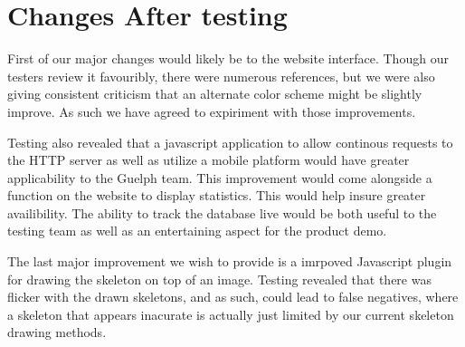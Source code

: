 \documentclass{scrreprt}
\begin{document}
\chapter{Changes After testing}
\begin{flushleft}
First of our major changes would likely be to the website interface. Though our testers review it favouribly, there were numerous references, but we were also giving consistent criticism that an alternate color scheme might be slightly improve. As such we have agreed to expiriment with those improvements. \newline

Testing also revealed that a javascript application to allow continous requests to the HTTP server as well as utilize a mobile platform would have greater applicability to the Guelph team. This improvement would come alongside a function on the website to display statistics. This would help insure greater availibility. The ability to track the database live would be both useful to the testing team as well as an entertaining aspect for the product demo. \newline

The last major improvement we wish to provide is a imrpoved Javascript plugin for drawing the skeleton on top of an image. Testing revealed that there was flicker with the drawn skeletons, and as such, could lead to false negatives, where a skeleton that appears inacurate is actually just limited by our current skeleton drawing methods.
\end{flushleft}
\end{document}
